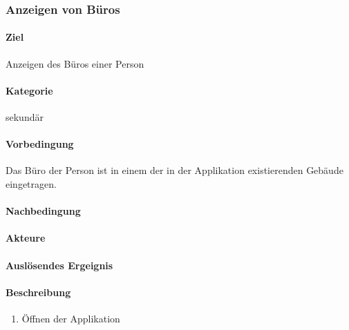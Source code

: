 \subsubsection{Anzeigen von Büros}
\label{Anzeigen von Büros}
\paragraph{Ziel}
Anzeigen des Büros einer Person
\paragraph{Kategorie}
sekundär
\paragraph{Vorbedingung}
Das Büro der Person ist in einem der in der Applikation existierenden Gebäude eingetragen.
\paragraph{Nachbedingung}

\paragraph{Akteure}

\paragraph{Auslösendes Ergeignis}

\paragraph{Beschreibung}
\begin{enumerate}
    \item Öffnen der Applikation
\end{enumerate}